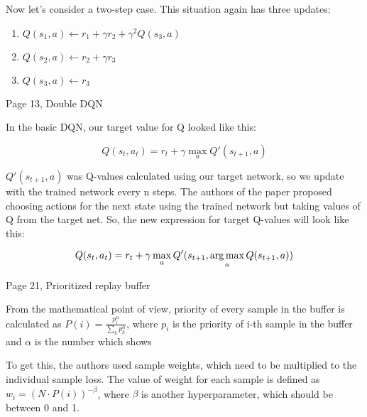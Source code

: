 Now let's consider a two-step case. This situation again has three updates:

\begin{enumerate}
	\item \begin{math}
	Q(s_1,a) \leftarrow r_1 + \gamma r_2 + \gamma^2 Q(s_3,a)
	\end{math}
	\item \begin{math}
	Q(s_2,a) \leftarrow r_2 + \gamma r_3
	\end{math}
	\item \begin{math}
	Q(s_3,a) \leftarrow r_3
	\end{math}
\end{enumerate}


Page 13, Double DQN

In the basic DQN, our target value for Q looked like this:

\begin{equation*}
  Q(s_t, a_t) = r_t + \gamma \max_a Q'(s_{t+1},a)
\end{equation*}

\begin{math}Q'(s_{t+1}, a)\end{math} was Q-values calculated using our target network, so we update with the trained network every n steps. The authors of the paper proposed choosing actions for the next state using the trained network but taking values of Q from the target net. So, the new expression for target Q-values will look like this:

\begin{equation*}
  Q(s_t, a_t) = r_t + \gamma \max_a Q'(s_{t+1},\operatorname*{arg\,max}_a Q(s_{t+1}, a))  
\end{equation*}


Page 21, Prioritized replay buffer

From the mathematical point of view, priority of every sample in the buffer is
calculated as \begin{math}P(i) = \frac{p_i^\alpha}{\sum_kp_k^\alpha}\end{math}, where $p_i$ is the priority of i-th sample in the buffer and $\alpha$ is
the number which shows


To get this, the authors used sample weights, which need to be multiplied to the
individual sample loss. The value of weight for each sample is defined as
\begin{math}w_i=(N \cdot P(i))^{-\beta}\end{math},
where \begin{math}\beta\end{math} is another hyperparameter, which should be between 0 and 1.

